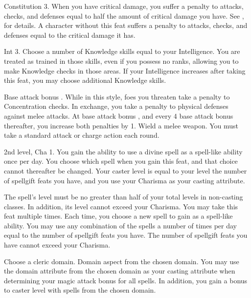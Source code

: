  Constitution 3.
 When you have critical damage, you suffer a penalty to attacks, checks, and defenses equal to half the amount of critical damage you have. See , for details.
 A character without this feat suffers a penalty to attacks, checks, and defenses equal to the critical damage it has.

 Int 3.
 Choose a number of Knowledge skills equal to your Intelligence. You are treated as trained in those skills, even if you possess no ranks, allowing you to make Knowledge checks in those areas. If your Intelligence increases after taking this feat, you may choose additional Knowledge skills.

 Base attack bonus .
 While in this style, foes you threaten take a  penalty to Concentration checks. In exchange, you take a  penalty to physical defenses against melee attacks. At base attack bonus , and every 4 base attack bonus thereafter, you increase both penalties by 1.
\stylereq Wield a melee weapon. You must take a standard attack or charge action each round.

\featpre 2nd level, Cha 1.
\featben You gain the ability to use a divine spell as a spell-like ability once per day. You choose which spell when you gain this feat, and that choice cannot thereafter be changed. Your caster level is equal to your level \add the number of spellgift feats you have, and you use your Charisma as your casting attribute.

The spell's level must be no greater than half of your total levels in non-casting classes. In addition, its level cannot exceed your Charisma.
 You may take this feat multiple times. Each time, you choose a new spell to gain as a spell-like ability. You may use any combination of the spells a number of times per day equal to the number of spellgift feats you have. The number of spellgift feats you have cannot exceed your Charisma.

Choose a cleric domain.
\featpre Domain aspect from the chosen domain.
\featben You may use the domain attribute from the chosen domain as your casting attribute when determining your magic attack bonus for all spells. In addition, you gain a  bonus to caster level with spells from the chosen domain.


